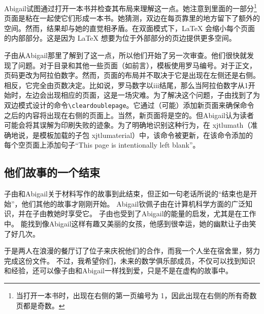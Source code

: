 Abigail试图通过打开一本书并检查其布局来理解这一点。她注意到里面的一部分\footnote{当打开一本书时，出现在右侧的第一页编号为 1，因此出现在右侧的所有奇数页都是奇数。} 页面是粘在一起使它们形成一本书。她猜测，双边在每页靠里的地方留下了额外的空间。然而，结果却与她的直觉相矛盾。在双面模式下，\LaTeX{} 会缩小每个页面的内部部分。这是因为 \LaTeX{} 想要为位于外部部分的页边提供更多空间。

子由从Abigail那里了解到了这一点，所以他们开始了另一次审查。他们很快就发现了问题。对于目录和其他一些页面（如前言），模板使用罗马编号。对于正文，页码更改为阿拉伯数字。然而，页面的布局并不取决于它是出现在左侧还是右侧。相反，它完全由页数决定。比如说，罗马数字以iii结尾，那么当阿拉伯数字从1开始时，左边会出现相应的页面，这是一场灾难。为了解决这个问题，子由找到了为双边模式设计的命令\verb=\cleardoublepage=。它通过（可能）添加新页面来确保命令之后的内容将出现在右侧的页面上。当然，新页面将是空的。但Abigail认为读者可能会将其误解为印刷失败的迹象。为了明确地识别这种行为，在 xjtlumath（准确地说，是模板加载的子包 xjtlumaterial）中，该命令被更新，在该命令添加的每个空页面上添加句子“This page is intentionally left blank”。

\subsection{他们故事的一个结束}
子由和Abigail关于材料写作的故事到此结束，但正如一句老话所说的“结束也是开始”，他们其他的故事才刚刚开始。 Abigail钦佩子由在计算机科学方面的广泛知识，并在子由教她时享受它。 子由也受到了Abigail的能量的启发，尤其是在工作中。 能找到像Abigail这样有趣又美丽的女孩，他感到很幸运，她的幽默让子由笑了好几次。

于是两人在浪漫的餐厅订了位子来庆祝他们的合作，而我一个人坐在宿舍里，努力完成这份文件。 不过，我希望你们，未来的数学俱乐部成员，不仅可以找到知识和经验，还可以像子由和Abigail一样找到爱，只是不是在虚构的故事中。